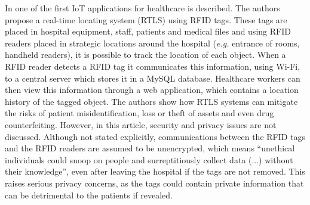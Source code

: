 


%

In \cite{Fuhrer2006} one of the first \acs{IoT} applications for healthcare is described. The authors propose a real-time locating system (RTLS) using \acs{RFID} tags. These tags are placed in hospital equipment, staff, patients and medical files and using \acs{RFID} readers placed in strategic locations around the hospital (\textit{e.g.} entrance of rooms, handheld readers), it is possible to track the location of each object. When a \acs{RFID} reader detects a \acs{RFID} tag it communicates this information, using Wi-Fi, to a central server which stores it in a MySQL database. Healthcare workers can then view this information through a web application, which contains a location history of the tagged object. The authors show how RTLS systems can mitigate the risks of patient misidentification, loss or theft of assets and even drug counterfeiting. However, in this article, security and privacy issues are not discussed. Although not stated explicitly, communications between the RFID tags and the RFID readers are assumed to be unencrypted, which means ``unethical individuals could snoop on people and surreptitiously collect data (...) without their knowledge'', even after leaving the hospital if the tags are not removed. This raises serious privacy concerns, as the tags could contain private information that can be detrimental to the patients if revealed.

